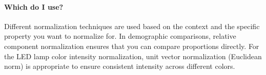 \documentclass{ximera}
\begin{document}
\paragraph{Which do I use?}
Different normalization techniques are used based on the context and
the specific property you want to normalize for. In demographic
comparisons, relative component normalization ensures that you can
compare proportions directly. For the LED lamp color intensity
normalization, unit vector normalization (Euclidean norm) is
appropriate to ensure consistent intensity across different colors.






\end{document}
